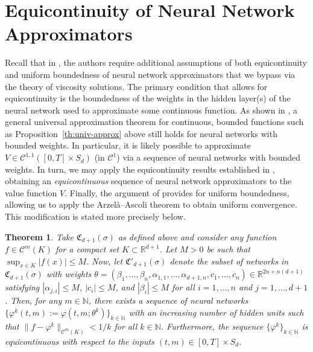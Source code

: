 \documentclass[11pt,reqno]{amsart}
\numberwithin{equation}{section}
\theoremstyle{plain}
\newtheorem{theorem}{Theorem}[section]
\newcommand{\R}{\mathbb{R}}
\newcommand{\sC}{\mathcal{C}}
\newcommand{\N}{\mathbb{N}}
\begin{document}
\section{Equicontinuity of Neural Network Approximators}
\label{app:b}
Recall that in \cite[Theorem 7.3]{dgm}, the authors require additional assumptions of both equicontinuity and uniform boundedness of neural network approximators that we bypass via the theory of viscosity solutions. The primary condition that allows for equicontinuity is the boundedness of the weights in the hidden layer(s) of the neural network used to approximate some continuous function. As shown in \cite{bdd-weights}, a general universal approximation theorem for continuous, bounded functions such as Proposition~\ref{th:univ-approx} above still holds for neural networks with bounded weights. In particular, it is likely possible to approximate $V \in \sC^{1,1}([0, T] \times S_d)$ (in $\sC^{1}$) via a sequence of neural networks with bounded weights. In turn, we may apply the equicontinuity results established in \cite{equi-nn}, obtaining an \textit{equicontinuous} sequence of neural network approximators to the value function $V$. Finally, the argument of \cite{dgm} provides for uniform boundedness, allowing us to apply the Arzelà--Ascoli theorem to obtain uniform convergence. This modification is stated more precisely below.
\begin{theorem}
\label{th:nn-equicont}
Take $\mathfrak{C}_{d+1}(\sigma)$ as defined above and consider any function $f \in \sC^{m}(K)$ for a compact set $K \subset \R^{d+1}$. Let $M > 0$ be such that $\sup_{x \in K} |f(x)| \leq M$. Now, let $\mathfrak{C}'_{d+1}(\sigma)$ denote the subset of networks in $\mathfrak{C}_{d+1}(\sigma)$ with weights $\theta = (\beta_1, \ldots, \beta_n, \alpha_{1,1}, \ldots, \alpha_{d+1,n}, c_1, \ldots, c_n) \in \R^{2n + n(d+1)}$ satisfying $|\alpha_{j, i}| \leq M$, $|c_i| \leq M$, and $|\beta_i| \leq M$ for all $i = 1,\ldots, n$ and $j = 1, \ldots, d+1$. Then, for any $m \in \N$, there exists a sequence of neural networks $\{\varphi^k(t,m):=\varphi(t,m;\theta^k)\}_{k \in \N}$ with an increasing number of hidden units such that $\|f - \varphi^k\|_{\sC^m(K)} < 1/k$ for all $k \in \N$. Furthermore, the sequence $\{\varphi^k\}_{k \in \N}$ is equicontinuous with respect to the inputs $(t,m) \in [0,T] \times S_d$.
\end{theorem}
\end{document}
